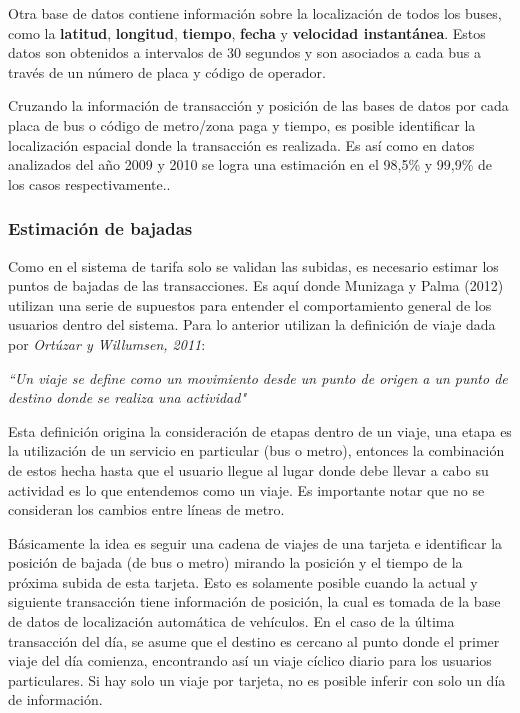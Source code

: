 \documentclass[12pt]{article}
\begin{document}

Otra base de datos contiene información sobre la localización de todos los buses, como la \textbf{latitud}, \textbf{longitud}, \textbf{tiempo}, \textbf{fecha} y \textbf{velocidad instantánea}. Estos datos son obtenidos a intervalos de 30 segundos y son asociados a cada bus a través de un número de placa y código de operador.

Cruzando la información de transacción y posición de las bases de datos por cada placa de bus o código de metro/zona paga y tiempo, es posible identificar la localización espacial donde la transacción es realizada. Es así como en datos analizados del año 2009 y 2010 se logra una estimación en el 98,5\% y 99,9\% de los casos respectivamente.\cite{Procesamiento_datos}.

\subsubsection{Estimación de bajadas}

Como en el sistema de tarifa solo se validan las subidas, es necesario estimar los puntos de bajadas de las transacciones. Es aquí donde Munizaga y Palma (2012)\cite{Procesamiento_datos} utilizan una serie de supuestos para entender el comportamiento general de los usuarios dentro del sistema. Para lo anterior utilizan la definición de viaje dada por \textit{Ortúzar y Willumsen, 2011}\cite{Viaje}:

\begin{center}
	\textit{``Un viaje se define como un movimiento desde un punto de origen a un punto de destino donde se realiza una actividad"}
\end{center} 

Esta definición origina la consideración de etapas dentro de un viaje, una etapa es la utilización de un servicio en particular (bus o metro), entonces la combinación de estos hecha hasta que el usuario llegue al lugar donde debe llevar a cabo su actividad es lo que entendemos como un viaje. Es importante notar que no se consideran los cambios entre líneas de metro.

Básicamente la idea es seguir una cadena de viajes de una tarjeta e identificar la posición de bajada (de bus o metro) mirando la posición y el tiempo de la próxima subida de esta tarjeta. Esto es solamente posible cuando la actual y siguiente transacción tiene información de posición, la cual es tomada de la base de datos de localización automática de vehículos. En el caso de la última transacción del día, se asume que el destino es cercano al punto donde el primer viaje del día comienza, encontrando así un viaje cíclico diario para los usuarios particulares. Si hay solo un viaje por tarjeta, no es posible inferir con solo un día de información.
\end{document}
